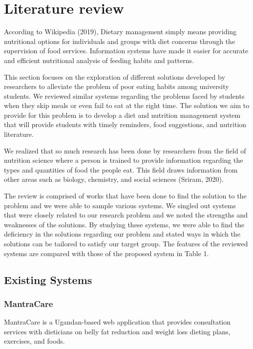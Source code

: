 \documentclass{article}
\begin{document}

\section{Literature review}
According to Wikipedia (2019), Dietary management simply means providing nutritional options for individuals and groups with diet concerns through the supervision of food services. Information systems have made it easier for accurate and efficient nutritional analysis of feeding habits and patterns.

This section focuses on the exploration of different solutions developed by researchers to alleviate the problem of poor eating habits among university students. We reviewed similar systems regarding the problems faced by students when they skip meals or even fail to eat at the right time. The solution we aim to provide for this problem is to develop a diet and nutrition management system that will provide students with timely reminders, food suggestions, and nutrition literature.

We realized that so much research has been done by researchers from the field of nutrition science where a person is trained to provide information regarding the types and quantities of food the people eat. This field draws information from other areas such as biology, chemistry, and social sciences (Sriram, 2020).

The review is comprised of works that have been done to find the solution to the problem and we were able to sample various systems. We singled out systems that were closely related to our research problem and we noted the strengths and weaknesses of the solutions. By studying these systems, we were able to find the deficiency in the solutions regarding our problem and stated ways in which the solutions can be tailored to satisfy our target group. The features of the reviewed systems are compared with those of the proposed system in Table 1.

\subsection{Existing Systems}

\subsubsection{MantraCare}
MantraCare is a Ugandan-based web application that provides consultation services with dieticians on belly fat reduction and weight loss dieting plans, exercises, and foods.
\end{document}

